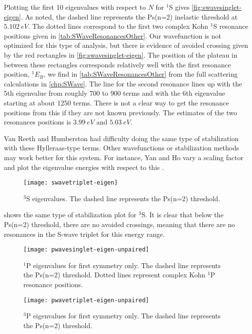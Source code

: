 \documentclass[Dissertation.tex]{subfiles}
\begin{document}
Plotting the first 10 eigenvalues with respect to $N$ for $^1$S gives
\cref{fig:swavesinglet-eigen}. As noted, the dashed line represents the Ps(n=2) 
inelastic threshold at $\SI{5.102}{eV}$. The dotted lines correspond to the 
first two complex Kohn $^1$S resonance positions given in
\cref{tab:SWaveResonancesOther}. Our wavefunction is not optimized for this type of 
analysis, but there is evidence of avoided crossing given by the red 
rectangles in \cref{fig:swavesinglet-eigen}. The position of the plateau in 
between these rectangles corresponds relatively well with the first resonance 
position, $^1E_R$, we find in \cref{tab:SWaveResonancesOther} from the full 
scattering calculations in \cref{chp:SWave}. The line for the second 
resonance lines up with the 5th eigenvalue from roughly 700 to 900 terms and 
with the 6th eigenvalue starting at about 1250 terms. There is not a clear 
way to get the resonance positions from this if they are not known 
previously. The estimates of the two resonances positions is $\SI{3.99}{eV}$ 
and $\SI{5.03}{eV}$.

Van Reeth and Humberston \cite{VanReeth2004} had difficulty doing the same 
type of stabilization with these Hylleraas-type terms. Other wavefunctions or 
stabilization methods may work better for this system. For instance, Yan and 
Ho vary a scaling factor and plot the eigenvalue energies with respect to 
this \cite{Yan2003}.

\begin{figure}[H]
	\centering
	\texttt{[image: swavetriplet-eigen]}
	\caption[$^3$S eigenvalues]{$^3$S eigenvalues. The dashed line represents the Ps(n=2) threshold.}
	\label{fig:swavetriplet-eigen}
\end{figure}

 shows the same type of stabilization plot for
$^3$S. It is clear that below the Ps(n=2) threshold, there are no avoided 
crossings, meaning that there are no resonances in the S-wave triplet for 
this energy range. 

\begin{figure}[H]
	\centering
	\texttt{[image: pwavesinglet-eigen-unpaired]}
	\caption[$^1$P eigenvalues for first symmetry only]{$^1$P eigenvalues for first symmetry only. The dashed line represents the Ps(n=2) threshold. Dotted lines represent complex Kohn $^1$P resonance positions.}
	\label{fig:pwavesinglet-eigen-unpaired}
\end{figure}

\begin{figure}[H]
	\centering
	\texttt{[image: pwavetriplet-eigen-unpaired]}
	\caption[$^3$P eigenvalues for first symmetry only]{$^3$P eigenvalues for first symmetry only. The dashed line represents the Ps(n=2) threshold.}
	\label{fig:pwavetriplet-eigen-unpaired}
\end{figure}
\end{document}
